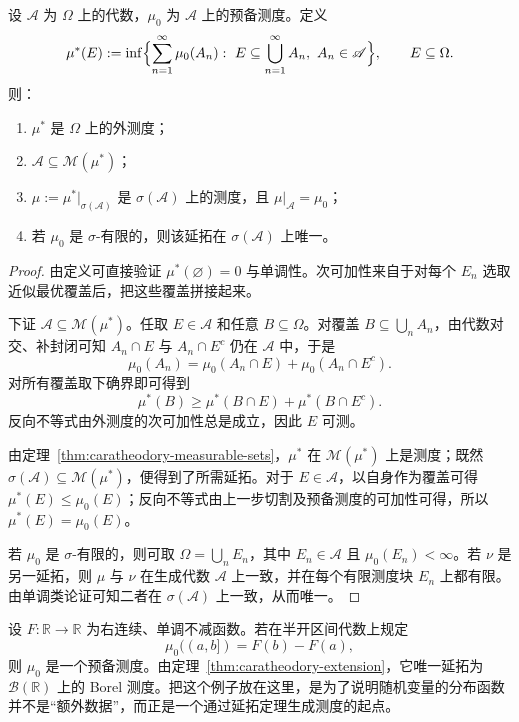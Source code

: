 \begin{theorem}\label{thm:caratheodory-extension}
设 $\mathscr A$ 为 $\Omega$ 上的代数，$\mu_0$ 为 $\mathscr A$ 上的预备测度。定义
\[
\mu^\ast(E):=\inf\Bigl\{\sum_{n=1}^{\infty}\mu_0(A_n):\ E\subseteq \bigcup_{n=1}^{\infty}A_n,\ A_n\in \mathscr A\Bigr\},\qquad E\subseteq \Omega.
\]
则：
\begin{enumerate}
  \item $\mu^\ast$ 是 $\Omega$ 上的外测度；
  \item $\mathscr A\subseteq \mathscr M(\mu^\ast)$；
  \item $\mu:=\mu^\ast|_{\sigma(\mathscr A)}$ 是 $\sigma(\mathscr A)$ 上的测度，且 $\mu|_{\mathscr A}=\mu_0$；
  \item 若 $\mu_0$ 是 $\sigma$-有限的，则该延拓在 $\sigma(\mathscr A)$ 上唯一。
\end{enumerate}
\end{theorem}

\begin{proof}
由定义可直接验证 $\mu^\ast(\varnothing)=0$ 与单调性。次可加性来自于对每个 $E_n$ 选取近似最优覆盖后，把这些覆盖拼接起来。

下证 $\mathscr A\subseteq \mathscr M(\mu^\ast)$。任取 $E\in \mathscr A$ 和任意 $B\subseteq \Omega$。对覆盖 $B\subseteq \bigcup_n A_n$，由代数对交、补封闭可知 $A_n\cap E$ 与 $A_n\cap E^c$ 仍在 $\mathscr A$ 中，于是
\[
\mu_0(A_n)=\mu_0(A_n\cap E)+\mu_0(A_n\cap E^c).
\]
对所有覆盖取下确界即可得到
\[
\mu^\ast(B)\ge \mu^\ast(B\cap E)+\mu^\ast(B\cap E^c).
\]
反向不等式由外测度的次可加性总是成立，因此 $E$ 可测。

由定理~\ref{thm:caratheodory-measurable-sets}，$\mu^\ast$ 在 $\mathscr M(\mu^\ast)$ 上是测度；既然 $\sigma(\mathscr A)\subseteq \mathscr M(\mu^\ast)$，便得到了所需延拓。对于 $E\in \mathscr A$，以自身作为覆盖可得 $\mu^\ast(E)\le \mu_0(E)$；反向不等式由上一步切割及预备测度的可加性可得，所以 $\mu^\ast(E)=\mu_0(E)$。

若 $\mu_0$ 是 $\sigma$-有限的，则可取 $\Omega=\bigcup_n E_n$，其中 $E_n\in \mathscr A$ 且 $\mu_0(E_n)<\infty$。若 $\nu$ 是另一延拓，则 $\mu$ 与 $\nu$ 在生成代数 $\mathscr A$ 上一致，并在每个有限测度块 $E_n$ 上都有限。由单调类论证可知二者在 $\sigma(\mathscr A)$ 上一致，从而唯一。
\end{proof}

\begin{example}[由分布函数生成测度]\label{ex:distribution-function-measure}
设 $F\colon \mathbb R\to \mathbb R$ 为右连续、单调不减函数。若在半开区间代数上规定
\[
\mu_0((a,b])=F(b)-F(a),
\]
则 $\mu_0$ 是一个预备测度。由定理~\ref{thm:caratheodory-extension}，它唯一延拓为 $\mathcal B(\mathbb R)$ 上的 Borel 测度。把这个例子放在这里，是为了说明随机变量的分布函数并不是“额外数据”，而正是一个通过延拓定理生成测度的起点。
\end{example}

